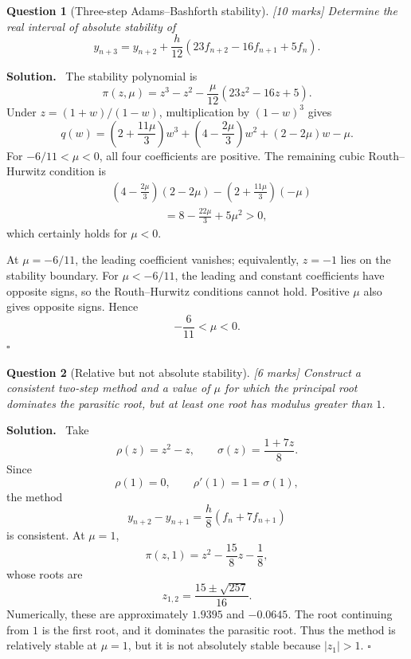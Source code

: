 \documentclass[11pt,a4paper]{article}
\theoremstyle{questionstyle}
\newtheorem{question}{Question}
\newenvironment{solution}
  {\par\noindent\textbf{\color{solutiongreen}Solution.}\ }
  {\hfill$\square$\par}
\newcommand{\pointmark}[1]{\hfill\textnormal{\textit{[#1 marks]}}}
\newcommand{\abs}[1]{\left|#1\right|}
\begin{document}
\begin{question}[Three-step Adams--Bashforth stability]\pointmark{10}
Determine the real interval of absolute stability of
\[
  y_{n+3}=y_{n+2}
  +\frac h{12}(23f_{n+2}-16f_{n+1}+5f_n).
\]
\end{question}

\begin{solution}
The stability polynomial is
\[
  \pi(z,\mu)
  =z^3-z^2-\frac{\mu}{12}(23z^2-16z+5).
\]
Under \(z=(1+w)/(1-w)\), multiplication by \((1-w)^3\) gives
\[
  q(w)
  =\left(2+\frac{11\mu}{3}\right)w^3
   +\left(4-\frac{2\mu}{3}\right)w^2
   +(2-2\mu)w-\mu.
\]
For \(-6/11<\mu<0\), all four coefficients are positive.  The
remaining cubic Routh--Hurwitz condition is
\[
\begin{split}
 &\left(4-\frac{2\mu}{3}\right)(2-2\mu)
 -\left(2+\frac{11\mu}{3}\right)(-\mu)\\
 &\hspace{2cm}
 =8-\frac{22\mu}{3}+5\mu^2>0,
\end{split}
\]
which certainly holds for \(\mu<0\).

At \(\mu=-6/11\), the leading coefficient vanishes; equivalently,
\(z=-1\) lies on the stability boundary.  For \(\mu<-6/11\), the
leading and constant coefficients have opposite signs, so the
Routh--Hurwitz conditions cannot hold.  Positive \(\mu\) also gives
opposite signs.  Hence
\[
  \boxed{-\frac6{11}<\mu<0}.
\]
\end{solution}

\begin{question}[Relative but not absolute stability]\pointmark{6}
Construct a consistent two-step method and a value of \(\mu\) for
which the principal root dominates the parasitic root, but at least
one root has modulus greater than \(1\).
\end{question}

\begin{solution}
Take
\[
  \rho(z)=z^2-z,\qquad
  \sigma(z)=\frac{1+7z}{8}.
\]
Since
\[
  \rho(1)=0,\qquad \rho'(1)=1=\sigma(1),
\]
the method
\[
  y_{n+2}-y_{n+1}
  =\frac h8(f_n+7f_{n+1})
\]
is consistent.  At \(\mu=1\),
\[
  \pi(z,1)=z^2-\frac{15}{8}z-\frac18,
\]
whose roots are
\[
  z_{1,2}=\frac{15\pm\sqrt{257}}{16}.
\]
Numerically, these are approximately \(1.9395\) and \(-0.0645\).
The root continuing from \(1\) is the first root, and it dominates the
parasitic root.  Thus the method is relatively stable at \(\mu=1\),
but it is not absolutely stable because \(\abs{z_1}>1\).
\end{solution}
\end{document}
